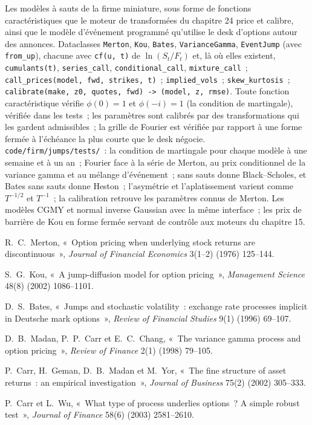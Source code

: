 \begin{build}
 Les modèles à sauts de la firme miniature, sous forme de fonctions caractéristiques que le moteur de transformées du
chapitre 24 price et calibre, ainsi que le modèle d'événement programmé qu'utilise le desk d'options autour des annonces.
 Dataclasses \texttt{Merton}, \texttt{Kou}, \texttt{Bates}, \texttt{VarianceGamma},
\texttt{EventJump} (avec \texttt{from\_up}), chacune avec \texttt{cf(u, t)} de $\ln(S_t/F_t)$ et, là où elles existent,
\texttt{cumulants(t)}, \texttt{series\_call}, \texttt{conditional\_call}, \texttt{mixture\_call}~;
\texttt{call\_prices(model, fwd, strikes, t)}~; \texttt{implied\_vols}~; \texttt{skew\_kurtosis}~;
\texttt{calibrate(make, z0, quotes, fwd) -> (model, z, rmse)}.
 Toute fonction caractéristique vérifie $\phi(0)=1$ et $\phi(-i)=1$ (la condition de martingale),
vérifiée dans les tests~; les paramètres sont calibrés par des transformations qui les gardent admissibles~; la grille de Fourier est
vérifiée par rapport à une forme fermée à l'échéance la plus courte que le desk négocie.
 \texttt{code/firm/jumps/tests/}~: la condition de martingale pour chaque modèle à une semaine
et à un an~; Fourier face à la série de Merton, au prix conditionnel de la variance gamma et au mélange d'événement~; sans
sauts donne Black--Scholes, et Bates sans sauts donne Heston~; l'asymétrie et l'aplatissement varient comme $T^{-1/2}$ et
$T^{-1}$~; la calibration retrouve les paramètres connus de Merton.
 Les modèles CGMY et normal inverse Gaussian avec la même interface~; les prix de barrière de Kou en forme fermée
servant de contrôle aux moteurs du chapitre 15.
\end{build}

\begin{omsources}
\item R.~C.~Merton, «~Option pricing when underlying stock returns are discontinuous~», \emph{Journal of Financial
Economics} 3(1--2) (1976) 125--144.
\item S.~G.~Kou, «~A jump-diffusion model for option pricing~», \emph{Management Science} 48(8) (2002) 1086--1101.
\item D.~S.~Bates, «~Jumps and stochastic volatility~: exchange rate processes implicit in Deutsche mark options~»,
\emph{Review of Financial Studies} 9(1) (1996) 69--107.
\item D.~B.~Madan, P.~P.~Carr et E.~C.~Chang, «~The variance gamma process and option pricing~», \emph{Review of
Finance} 2(1) (1998) 79--105.
\item P.~Carr, H.~Geman, D.~B.~Madan et M.~Yor, «~The fine structure of asset returns~: an empirical
investigation~», \emph{Journal of Business} 75(2) (2002) 305--333.
\item P.~Carr et L.~Wu, «~What type of process underlies options~? A simple robust test~», \emph{Journal of
Finance} 58(6) (2003) 2581--2610.
\end{omsources}

